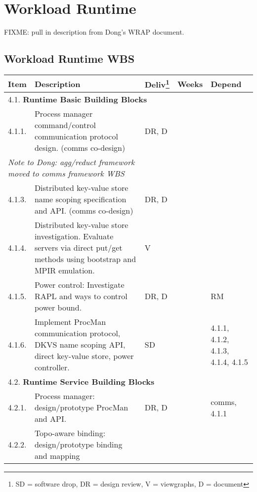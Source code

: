 \section{Workload Runtime}

FIXME: pull in description from Dong's WRAP document.

\newpage
\subsection{Workload Runtime WBS}

\begin{longtable}{|p{1cm}|p{10.2cm}|p{1cm}|p{1cm}|p{1.8cm}|}\hline
  \textbf{Item} & \textbf{Description}
                & \textbf{Deliv}\footnote{SD = software drop,
                        DR = design review, V = viewgraphs, D = document}
                & \textbf{Weeks} & \textbf{Depend} \\
  \hline
  \hline
  \multicolumn{5}{|l|}{4.1. \textbf{Runtime Basic Building Blocks}} \\
  \hline
  4.1.1.& Process manager command/control communication protocol design.
          (comms co-design)
        & DR, D
        & 
        & \\
  \hline
  \multicolumn{2}{|l|}{\em Note to Dong: agg/reduct framework moved to comms
              framework WBS}
        &
        &
        & \\
  \hline
  4.1.3.& Distributed key-value store name scoping specification and API.
          (comms co-design)
        & DR, D
        & 
        & \\
  \hline
  4.1.4.& Distributed key-value store investigation.  Evaluate servers
          via direct put/get methods using bootstrap and MPIR emulation.
        & V
        & 
        & \\
  \hline
  4.1.5.& Power control: Investigate  RAPL and ways to control power bound.
        & DR, D
        & 
        & RM \\
  \hline
  4.1.6.& Implement ProcMan communication protocol, DKVS name scoping API,
          direct key-value store, power controller.
        & SD
        & 
        & 4.1.1, 4.1.2, 4.1.3, 4.1.4, 4.1.5 \\
  \hline
  \multicolumn{5}{|l|}{4.2. \textbf{Runtime Service Building Blocks}} \\
  \hline
  4.2.1.& Process manager: design/prototype ProcMan and API.
        & DR, D
        & 
        & comms, 4.1.1\\
  \hline
  4.2.2.& Topo-aware binding: design/prototype binding and mapping

\end{longtable}
